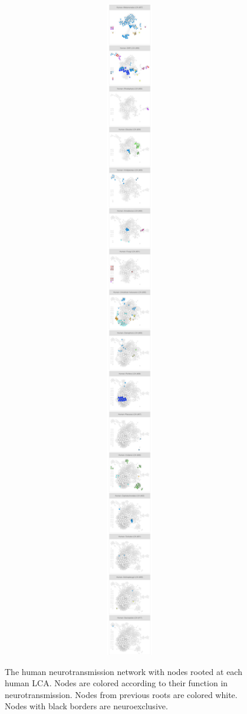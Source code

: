 \begin{figure}[p]

\caption{The human neurotransmission network with nodes rooted at each human LCA. Nodes are colored according to their function in neurotransmission. Nodes from previous roots are colored white. Nodes with black borders are neuroexclusive.}\label{fig:analysis.network.wrap_functions-1}

{\centering \includegraphics[height=100in, width=6.9in]{figs/analysis.network.wrap_functions-1} }

\end{figure}

